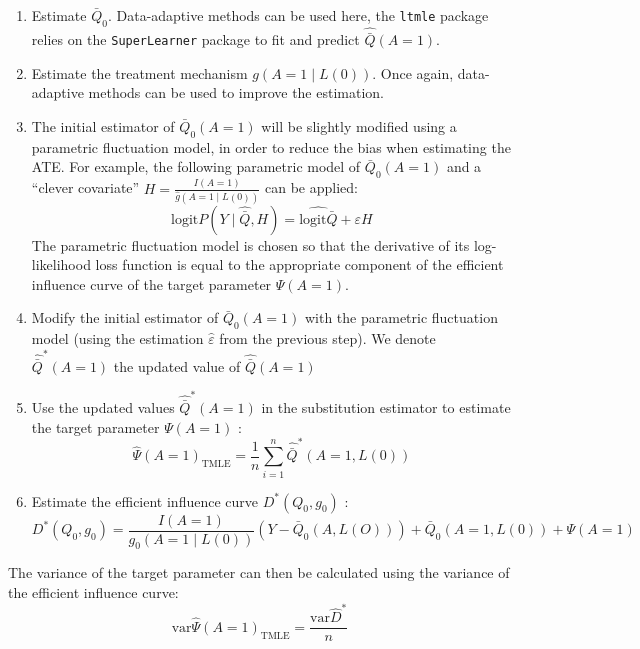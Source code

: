 \documentclass[
]{book}
\begin{document}
\begin{enumerate}
\def\labelenumi{\arabic{enumi}.}
\item
  Estimate \(\bar{Q}_0\). Data-adaptive methods can be used here, the \texttt{ltmle} package relies on the \texttt{SuperLearner} package to fit and predict \(\hat{\bar{Q}}(A=1)\).
\item
  Estimate the treatment mechanism \(g(A=1 \mid L(0))\). Once again, data-adaptive methods can be used to improve the estimation.
\item
  The initial estimator of \(\bar{Q}_0(A=1)\) will be slightly modified using a parametric fluctuation model, in order to reduce the bias when estimating the ATE. For example, the following parametric model of \(\bar{Q}_0(A=1)\) and a ``clever covariate'' \(H = \frac{I(A=1)}{\hat{g}(A=1 \mid L(0))}\) can be applied:
  \begin{equation*}
   \text{logit} P(Y \mid \hat{\bar{Q}}, H) = \hat{\text{logit} \bar{Q}} + \varepsilon H
  \end{equation*}
  The parametric fluctuation model is chosen so that the derivative of its log-likelihood loss function is equal to the appropriate component of the efficient influence curve of the target parameter \(\Psi(A=1)\).
\item
  Modify the initial estimator of \(\bar{Q}_0(A=1)\) with the parametric fluctuation model (using the estimation \(\hat{\varepsilon}\) from the previous step). We denote \(\hat{\bar{Q}}^*(A=1)\) the updated value of \(\hat{\bar{Q}}(A=1)\)
\item
  Use the updated values \(\hat{\bar{Q}}^*(A=1)\) in the substitution estimator to estimate the target parameter \(\Psi(A=1)\) :
  \begin{equation*}
  \hat{\Psi}(A=1)_\text{TMLE} = \frac{1}{n} \sum_{i=1}^n \hat{\bar{Q}}^* (A=1,L(0)) 
  \end{equation*}
\item
  Estimate the efficient influence curve \(D^*(Q_0,g_0)\) :
  \begin{equation*}
  D^*(Q_0,g_0) = \frac{I(A=1)}{g_0(A=1 \mid L(0))}(Y - \bar{Q}_0(A,L(O))) + \bar{Q}_0(A=1,L(0))  + \Psi(A=1)
  \end{equation*}
\end{enumerate}

The variance of the target parameter can then be calculated using the variance of the efficient influence curve:
\begin{equation*}
\text{var} \hat{\Psi}(A=1)_\text{TMLE} = \frac{\text{var} \hat{D}^*}{n}
\end{equation*}
\end{document}
